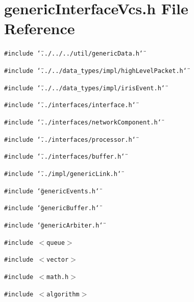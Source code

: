 \section{genericInterfaceVcs.h File Reference}
\label{genericInterfaceVcs_8h}
{\tt \#include \char`\"{}../../../util/genericData.h\char`\"{}}\par
{\tt \#include \char`\"{}../../data\_\-types/impl/highLevelPacket.h\char`\"{}}\par
{\tt \#include \char`\"{}../../data\_\-types/impl/irisEvent.h\char`\"{}}\par
{\tt \#include \char`\"{}../interfaces/interface.h\char`\"{}}\par
{\tt \#include \char`\"{}../interfaces/networkComponent.h\char`\"{}}\par
{\tt \#include \char`\"{}../interfaces/processor.h\char`\"{}}\par
{\tt \#include \char`\"{}../interfaces/buffer.h\char`\"{}}\par
{\tt \#include \char`\"{}../impl/genericLink.h\char`\"{}}\par
{\tt \#include \char`\"{}genericEvents.h\char`\"{}}\par
{\tt \#include \char`\"{}genericBuffer.h\char`\"{}}\par
{\tt \#include \char`\"{}genericArbiter.h\char`\"{}}\par
{\tt \#include $<$queue$>$}\par
{\tt \#include $<$vector$>$}\par
{\tt \#include $<$math.h$>$}\par
{\tt \#include $<$algorithm$>$}\par



